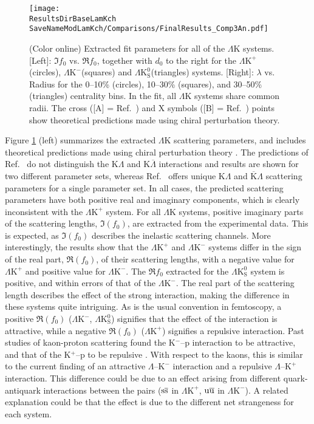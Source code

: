 \documentclass[ALICE,manyauthors]{cernphprep}
\newcommand{\ResultsDirBaseLamKch}{/home/jesse/Analysis/FemtoAnalysis/Results/Results_cLamcKch_20190319/}
\newcommand{\MomRes}{_MomResCrctn}%
\newcommand{\NonFlatBgdLamKch}{_NonFlatBgdCrctnLamK0LamKchPolynomial}
\newcommand{\ResNum}{_3Res}
\newcommand{\PrimMaxDecay}{_PrimMaxDecay10fm}
\newcommand{\ResMethod}{_UsingXiDataAndCoulombOnly}
\newcommand{\ParamFixAndShareLamKch}{_ShareLam_Dualie_ShareLam_ShareRadii}
\newcommand{\SaveNameModLamKch}{\MomRes\NonFlatBgdLamKch\ResNum\PrimMaxDecay\ResMethod\ParamFixAndShareLamKch}
\newcommand{\Lam}{$\Lambda$\xspace}
\newcommand{\ALam}{$\overline{\Lambda}$\xspace}
\newcommand{\KchP}{$\mathrm{K^{+}}$\xspace}
\newcommand{\KchM}{$\mathrm{K^{-}}$\xspace}
\newcommand{\LamK}{$\Lambda$K\xspace}
\newcommand{\LamKchP}{$\Lambda\mathrm{K^{+}}$\xspace}
\newcommand{\LamKchM}{$\Lambda\mathrm{K^{-}}$\xspace}
\newcommand{\LamKs}{$\Lambda\mathrm{K^{0}_{S}}$\xspace}
\begin{document}
\begin{figure}[h]
  \centering
  \texttt{[image: \\ResultsDirBaseLamKch\\SaveNameModLamKch/Comparisons/FinalResults\_Comp3An.pdf]}
  \caption[Extracted Scattering Parameters]
  {
  (Color online) Extracted fit parameters for all of the \LamK systems.  
  [Left]: $\Im f_{0}$ vs. $\Re f_{0}$, together with $d_{0}$ to the right for the \LamKchP (circles), \LamKchM (squares) and \LamKs (triangles) systems.  
  [Right]: $\lambda$ vs. Radius for the 0--10\% (circles), 10--30\% (squares), and 30--50\% (triangles) centrality bins.  
  In the fit, all \LamK systems share common radii.
  The cross ([A] = Ref.\ \cite{Liu:2006xja}) and X symbols ([B] = Ref.\ \cite{Mai:2009ce}) points show theoretical predictions made using chiral perturbation theory.
  }
  \label{fig:ScattParams_3Res}
\end{figure}

Figure \ref{fig:ScattParams_3Res} (left) summarizes the extracted \LamK scattering parameters, and includes theoretical predictions made using chiral perturbation theory \cite{Liu:2006xja,Mai:2009ce}.
The predictions of Ref.\ \cite{Liu:2006xja} do not distinguish the K\Lam and K\ALam interactions and results are shown for two different parameter sets, whereas Ref.\ \cite{Mai:2009ce} offers unique K\Lam and $\overline{\mathrm{K}}$\Lam scattering parameters for a single parameter set. 
In all cases, the predicted scattering parameters have both positive real and imaginary components, which is clearly inconsistent with the \LamKchP system.
For all \LamK systems, positive imaginary parts of the scattering lengths, $\Im(f_{0})$, are extracted from the experimental data. 
This is expected, as $\Im(f_{0})$ describes the inelastic scattering channels.
More interestingly, the results show that the \LamKchP and \LamKchM systems differ in the sign of the real part, $\Re(f_{0})$, of their scattering lengths, with a negative value for \LamKchP and positive value for \LamKchM.
The $\Re f_{0}$ extracted for the \LamKs system is positive, and within errors of that of the \LamKchM. 
The real part of the scattering length describes the effect of the strong interaction, making the difference in these systems quite intriguing.
As is the usual convention in femtoscopy, a positive $\Re(f_{0})$ (\LamKchM, \LamKs) signifies that the effect of the interaction is attractive, while a negative $\Re(f_{0})$ (\LamKchP) signifies a repulsive interaction.
Past studies of kaon-proton scattering found the K$^{-}$--p interaction to be attractive, and that of the K$^{+}$--p to be repulsive \cite{Humphrey:1962zz, Hadjimichef:2002xe, Ikeda:2012au}.
With respect to the kaons, this is similar to the current finding of an attractive \Lam--\KchM interaction and a repulsive \Lam--\KchP interaction.
This difference could be due to an effect arising from different quark-antiquark interactions between the pairs ($\rm s\overline{s}$ in \LamKchP, $\rm u\overline{u}$ in \LamKchM).
A related explanation could be that the effect is due to the different net strangeness for each system.
\end{document}
